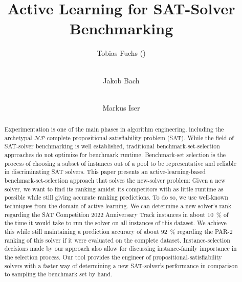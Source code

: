 \documentclass[runningheads]{llncs}
\begin{document}
\title{Active Learning for SAT-Solver Benchmarking}

\author{
	Tobias Fuchs (\Letter) \and \\
	Jakob Bach \and \\
	Markus Iser
}



\maketitle

\begin{abstract}
  Experimentation is one of the main phases in algorithm engineering, including the archetypal $\mathcal{NP}$-complete propositional-sat\-is\-fia\-bi\-li\-ty problem (SAT).
  While the field of SAT-solver benchmarking is well established, traditional benchmark-set-selection approaches do not optimize for benchmark runtime.
  Benchmark-set selection is the process of choosing a subset of instances out of a pool to be representative and reliable in discriminating SAT solvers.
  This paper presents an active-learning-based benchmark-set-selection approach that solves the new-solver problem:
  Given a new solver, we want to find its ranking amidst its competitors with as little runtime as possible while still giving accurate ranking predictions.
  To do so, we use well-known techniques from the domain of active learning.
  We can determine a new solver's rank regarding the SAT Competition 2022 Anniversary Track instances in about \SI{10}{\%} of the time it would take to run the solver on all instances of this dataset.
  We achieve this while still maintaining a prediction accuracy of about \SI{92}{\%} regarding the PAR-2 ranking of this solver if it were evaluated on the complete dataset.
  Instance-selection decisions made by our approach also allow for discussing instance-family importance in the selection process. 
  Our tool provides the engineer of propositional-satisfiability solvers with a faster way of determining a new SAT-solver's performance in comparison to sampling the benchmark set by hand.

\end{abstract}
\end{document}
